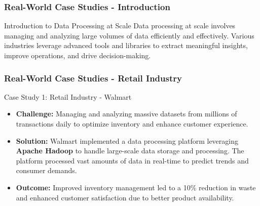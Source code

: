 \documentclass[aspectratio=169]{beamer}
\begin{document}
\begin{frame}[fragile]
    \frametitle{Real-World Case Studies - Introduction}
    \begin{block}{Introduction to Data Processing at Scale}
        Data processing at scale involves managing and analyzing large volumes of data efficiently and effectively. Various industries leverage advanced tools and libraries to extract meaningful insights, improve operations, and drive decision-making.
    \end{block}
\end{frame}

\begin{frame}[fragile]
    \frametitle{Real-World Case Studies - Retail Industry}
    \begin{block}{Case Study 1: Retail Industry - Walmart}
        \begin{itemize}
            \item \textbf{Challenge:} Managing and analyzing massive datasets from millions of transactions daily to optimize inventory and enhance customer experience.
            \item \textbf{Solution:} 
            Walmart implemented a data processing platform leveraging \textbf{Apache Hadoop} to handle large-scale data storage and processing. The platform processed vast amounts of data in real-time to 
            predict trends and consumer demands.
            \item \textbf{Outcome:} Improved inventory management led to a 10\% reduction in waste and enhanced customer satisfaction due to better product availability.
        \end{itemize}
    \end{block}
\end{frame}
\end{document}
